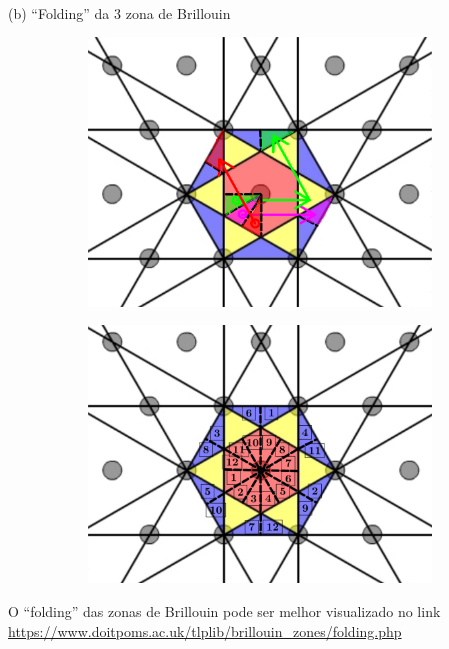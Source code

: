 \documentclass[aspectratio=169]{beamer}
\begin{document}


\begin{frame}{(b) ``Folding'' da 3\textsuperscript{} zona de Brillouin}

\begin{figure}[H]
\centering
\begin{subfigure}{.45\textwidth}
  \centering
  \includegraphics[width=\linewidth]{fig/3rd_bz-folding_3.png}
\end{subfigure}%
\quad \quad
\begin{subfigure}{.45\textwidth}
  \centering
  \includegraphics[width=\linewidth]{fig/3rd_bz-folding_4.png}
\end{subfigure}
\end{figure}

O ``folding'' das zonas de Brillouin pode ser melhor visualizado no link
\textcolor{blue}{\url{https://www.doitpoms.ac.uk/tlplib/brillouin_zones/folding.php}}


\end{frame}
\end{document}
